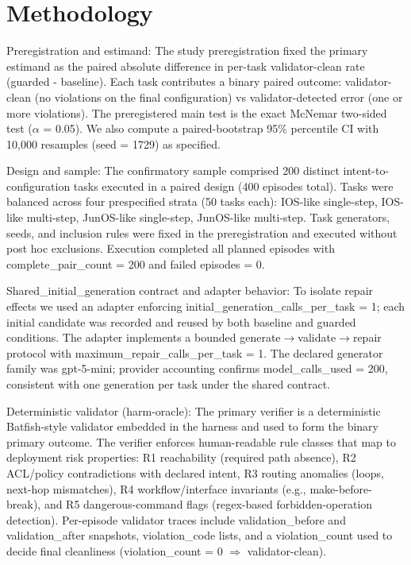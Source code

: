 \documentclass[conference]{IEEEtran}
\begin{document}
\section{Methodology}
Preregistration and estimand: The study preregistration fixed the primary estimand as the paired absolute difference in per-task validator-clean rate (guarded - baseline). Each task contributes a binary paired outcome: validator-clean (no violations on the final configuration) vs validator-detected error (one or more violations). The preregistered main test is the exact McNemar two-sided test (\ensuremath{\alpha} = 0.05). We also compute a paired-bootstrap 95\% percentile CI with 10,000 resamples (seed = 1729) as specified.

Design and sample: The confirmatory sample comprised 200 distinct intent-to-configuration tasks executed in a paired design (400 episodes total). Tasks were balanced across four prespecified strata (50 tasks each): IOS-like single-step, IOS-like multi-step, JunOS-like single-step, JunOS-like multi-step. Task generators, seeds, and inclusion rules were fixed in the preregistration and executed without post hoc exclusions. Execution completed all planned episodes with complete\_pair\_count = 200 and failed episodes = 0.

Shared\_initial\_generation contract and adapter behavior: To isolate repair effects we used an adapter enforcing initial\_generation\_calls\_per\_task = 1; each initial candidate was recorded and reused by both baseline and guarded conditions. The adapter implements a bounded generate\ensuremath{\rightarrow}validate\ensuremath{\rightarrow}repair protocol with maximum\_repair\_calls\_per\_task = 1. The declared generator family was gpt-5-mini; provider accounting confirms model\_calls\_used = 200, consistent with one generation per task under the shared contract.

Deterministic validator (harm-oracle): The primary verifier is a deterministic Batfish-style validator embedded in the harness and used to form the binary primary outcome. The verifier enforces human-readable rule classes that map to deployment risk properties: R1 reachability (required path absence), R2 ACL/policy contradictions with declared intent, R3 routing anomalies (loops, next-hop mismatches), R4 workflow/interface invariants (e.g., make-before-break), and R5 dangerous-command flags (regex-based forbidden-operation detection). Per-episode validator traces include validation\_before and validation\_after snapshots, violation\_code lists, and a violation\_count used to decide final cleanliness (violation\_count = 0 \ensuremath{\Rightarrow} validator-clean).
\end{document}
